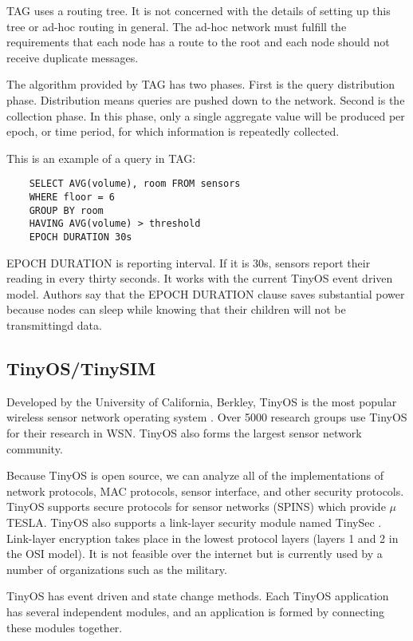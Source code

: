 \documentclass[a4paper]{article}
\begin{document}
TAG uses a routing tree. It is not concerned with the details of setting up
this tree or ad-hoc routing in general. The ad-hoc network must fulfill the
requirements that each node has a route to the root and each node should not
receive duplicate messages.

The algorithm provided by TAG has two phases. First is the query distribution
phase. Distribution means queries are pushed down to the network. Second is
the collection phase. In this phase, only a single aggregate value will be
produced per epoch, or time period, for which information is repeatedly
collected.

This is an example of a query in TAG:

\begin{verbatim}
	SELECT AVG(volume), room FROM sensors
	WHERE floor = 6
	GROUP BY room
	HAVING AVG(volume) > threshold
	EPOCH DURATION 30s
\end{verbatim}

EPOCH DURATION is reporting interval. If it is 30s, sensors report their
reading in every thirty seconds. It works with the current TinyOS event driven
model. Authors say that the EPOCH DURATION clause saves substantial power
because nodes can sleep while knowing that their children will not be
transmittingd data.

\subsection{TinyOS/TinySIM}
Developed by the University of California, Berkley, TinyOS is the most popular
wireless sensor network operating system \cite{TinyOS}. Over 5000 research
groups use TinyOS for their research in WSN. TinyOS also forms the largest
sensor network community.

Because TinyOS is open source, we can analyze all of the implementations of
network protocols, MAC protocols, sensor interface, and other security
protocols.  TinyOS supports secure protocols for sensor networks (SPINS) which
provide $\mu$TESLA. TinyOS also supports a link-layer security module named
TinySec \cite{Karlof04}.  Link-layer encryption takes place in the lowest
protocol layers (layers 1 and 2 in the OSI model). It is not feasible over the
internet but is currently used by a number of organizations such as the
military.

TinyOS has event driven and state change methods. Each TinyOS application has
several independent modules, and an application is formed by connecting these
modules together.
\end{document}
